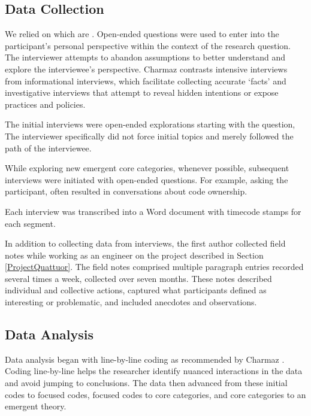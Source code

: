 \subsection{Data Collection}
We relied on  which are  \cite{Charmaz}. Open-ended questions were used to enter into the participant's personal perspective within the context of the research question. The interviewer attempts to abandon assumptions to better understand and explore the interviewee's perspective. Charmaz \cite{Charmaz} contrasts intensive interviews from informational interviews, which facilitate collecting accurate `facts’ and investigative interviews that attempt to reveal hidden intentions or expose practices and policies. 
 
The initial interviews were open-ended explorations starting with the question,  The interviewer specifically did not force initial topics and merely followed the path of the interviewee. 

While exploring new emergent core categories, whenever possible, subsequent interviews were initiated with open-ended questions.  For example, asking the participant,  often resulted in conversations about code ownership. 

Each interview was transcribed into a Word document with timecode stamps for each segment.

In addition to collecting data from interviews, the first author collected field notes while working as an engineer on the project described in Section \ref{ProjectQuattuor}. The field notes comprised multiple paragraph entries recorded several times a week, collected over seven months. These notes described individual and collective actions, captured what participants defined as interesting or problematic, and included anecdotes and observations. 
\subsection{Data Analysis}
Data analysis began with line-by-line coding as recommended by Charmaz \cite{Charmaz}. Coding line-by-line helps the researcher identify nuanced interactions in the data and avoid jumping to conclusions. The data then advanced from these initial codes to focused codes, focused codes to core categories, and core categories to an emergent theory. 

